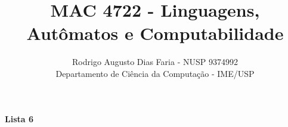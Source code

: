 \documentclass[12pt]{article}
\begin{document}
\title{MAC 4722 - Linguagens, Autômatos e Computabilidade}
\author{Rodrigo Augusto Dias Faria - NUSP 9374992\\
Departamento de Ciência da Computação - IME/USP}

\maketitle

\begin{comment}
\begin{center}
\textbf{\large{Lista 1}}
\end{center}




\begin{center}
\textbf{\large{Lista 2}}
\end{center}





\begin{center}
\textbf{\large{Lista 3}}
\end{center}





\begin{center}
\textbf{\large{Lista 4}}
\end{center}







\begin{center}
\textbf{\large{Lista 5}}
\end{center}





\end{comment}

\begin{center}
\textbf{\large{Lista 6}}
\end{center}





\printbibliography
\end{document}
